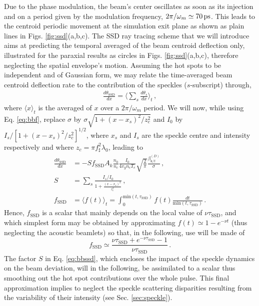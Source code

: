\documentclass[%
 reprint,
 amsmath,amssymb,
 aps,
]{revtex4-1}
\begin{document}
Due to the phase modulation, the beam's center oscillates as soon as its injection and  on a period given by the modulation frequency, $2\pi/\omega_m\simeq 70\,\rm ps$. This leads to the centroid periodic movement at the simulation exit plane as shown as  plain lines in Figs.  \ref{fig:ssd}(a,b,c). The SSD ray tracing scheme that we will introduce aims at predicting the temporal averaged of the beam centroid deflection only, illustrated for the paraxial results as circles in Figs. \ref{fig:ssd}(a,b,c), therefore neglecting the spatial envelope's motion.
Assuming the hot spots to be independent and of Gaussian form, we may relate the time-averaged beam centroid deflection rate to the  contribution of the speckles ($s$-subscript) through, 
\begin{align}
  \frac{d\theta_\mathrm{SSD}}{dx}  =   \langle \sum_s\frac{d\theta_s}{dx}\rangle_t \, ,
  \end{align}
  where   $\langle x\rangle_t$ is the averaged of $x$ over a $2\pi/\omega_m$ period.
We will now, while using  Eq. \eqref{eq:bbf}, replace $\sigma$ by $\sigma\sqrt{1+(x-x_s)^2/z_c^2}$ and $I_0$ by $I_s/[1+(x-x_s)^2/z_c^2]^{1/2}$, where $x_s$ and $I_s$ are the speckle centre  and intensity respectively and where $z_c=\pi f_\sharp^2\lambda_0$, leading to 
  \begin{align}
 \frac{d\theta_\mathrm{SSD}}{dx}  &=   -S f_\mathrm{SSD} A_k \frac{n_0 }{n_c}  \frac{  I_0 }{ 4 v_g n_c T_e } \sqrt{\frac{2}{\pi}}   \frac{\beta_\mathrm{k/f}^{(D)} }{ \sigma}      \, , \nonumber \\
 S &=\sum_s \frac{I_s/I_0}{1+\frac{(x-x_s)^2}{z_c^2}}  \, , \nonumber \\
  f_\mathrm{SSD}  &= \langle f(t) \rangle_t = \int_0^{\mathrm{min}(t,\tau_\mathrm{SSD})} f(t) \frac{dt}{\mathrm{min}(t,\tau_\mathrm{SSD})} \, . \label{eq:bbssd}
  \end{align}
Hence, $ f_\mathrm{SSD}$ is a scalar that mainly depends on the local value of $\nu\tau_\mathrm{SSD}$, and which simplest form may be obtained by approximating $f(t)\simeq 1-e^{-\nu t}$ (thus neglecting the acoustic beamlets)  so that, in the following, use will be made of 
\begin{equation}
     f_\mathrm{SSD} \simeq \frac{\nu\tau_\mathrm{SSD}+ e^{-\nu\tau_\mathrm{SSD}} -1}{\nu\tau_\mathrm{SSD}}\, . \label{eq:fssdf}
\end{equation}
The factor $S$ in Eq. \eqref{eq:bbssd}, which encloses the impact of the speckle dynamics on the beam deviation, will in the following, be assimilated to a scalar thus smoothing out the hot spot contributions over the whole pulse.  This final approximation implies to neglect the speckle scattering disparities resulting from the variability of their intensity (see Sec. \ref{sec:speckle}).
\end{document}
